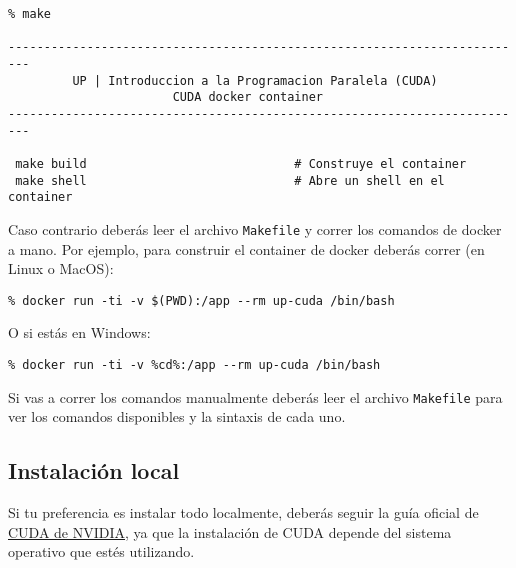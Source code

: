 \begin{lstlisting}
% make

-------------------------------------------------------------------------
         UP | Introduccion a la Programacion Paralela (CUDA)
                       CUDA docker container
-------------------------------------------------------------------------

 make build                             # Construye el container
 make shell                             # Abre un shell en el container

\end{lstlisting}

Caso contrario deberás leer el archivo \texttt{Makefile} y correr los comandos de docker a mano. Por ejemplo, para
construir el container de docker deberás correr (en Linux o MacOS):

\begin{lstlisting}
% docker run -ti -v $(PWD):/app --rm up-cuda /bin/bash
\end{lstlisting}

O si estás en Windows:

\begin{lstlisting}
% docker run -ti -v %cd%:/app --rm up-cuda /bin/bash
\end{lstlisting}

Si vas a correr los comandos manualmente deberás leer el archivo \texttt{Makefile} para ver los comandos disponibles y
la sintaxis de cada uno.

\subsection{Instalación local}

Si tu preferencia es instalar todo localmente, deberás seguir la guía oficial de
\href{https://docs.nvidia.com/cuda/cuda-quick-start-guide/index.html}{CUDA de NVIDIA}, ya que la instalación de CUDA
depende del sistema operativo que estés utilizando.




